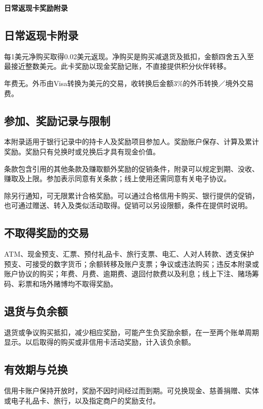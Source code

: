 \documentclass[UTF8,fontset=none,11pt,a4paper]{ctexart}
\begin{document}
{\noindent\fontsize{20}{25}\selectfont\bfseries 日常返现卡奖励附录\par}
\vspace{10pt}
\subsection*{日常返现卡附录}
每1美元净购买取得0.02美元返现。净购买是购买减退货及抵扣，金额四舍五入至最接近整数美元。此卡奖励以现金奖励记账，不直接提供积分伙伴转移。


年费无。外币由Visa转换为美元的交易，收转换后金额3\%的外币转换／境外交易费。


\subsection*{参加、奖励记录与限制}
本附录适用于银行记录中的持卡人及奖励项目参加人。奖励账户保存、计算及累计奖励。奖励只有兑换时或兑换后才具有现金价值。


条款包含引用的其他条款及赚取额外奖励的促销条件，附录可以规定到期、没收、赚取及上限。参加表示同意有关条款；线上使用还需同意有关电子协议。


除另行通知，可无限累计合格奖励。可以通过合格信用卡购买、银行提供的促销，也可通过赠送、转入及类似活动取得。促销可以另设限额，条件在提供时说明。


\subsection*{不取得奖励的交易}
ATM、现金预支、汇票、预付礼品卡、旅行支票、电汇、人对人转款、透支保护预支、可接受的数字货币；余额转移及账户支票；争议或违法购买；违反本附录或账户协议的购买；年费、月费、逾期费、退回付款费以及利息；线上下注、赌场筹码、彩票和场外赌博均不取得奖励。


\subsection*{退货与负余额}
退货或争议购买抵扣，减少相应奖励，可能产生负奖励余额，在一至两个账单周期显示。以后取得的购买或非信用卡活动奖励，计入该负余额。


\subsection*{有效期与兑换}
信用卡账户保持开放时，奖励不因时间经过而到期。可兑换现金、慈善捐赠、实体或电子礼品卡、旅行，以及指定商户的奖励支付。
\end{document}
